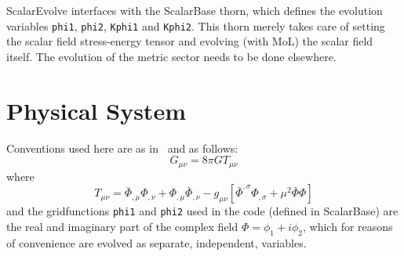 ScalarEvolve interfaces with the ScalarBase thorn, which defines the evolution
variables \texttt{phi1}, \texttt{phi2}, \texttt{Kphi1} and \texttt{Kphi2}.
%
This thorn merely takes care of setting the scalar field stress-energy tensor
and evolving (with MoL) the scalar field itself. The evolution of the metric
sector needs to be done elsewhere.

\section{Physical System}

Conventions used here are as in~\cite{Scalar_Cunha:2017wao} and as follows:
\begin{equation}
  G_{\mu \nu} = 8 \pi G T_{\mu \nu}
\end{equation}
where
\begin{equation}
  T_{\mu \nu} = \bar \Phi_{,\mu} \Phi_{,\nu} + \Phi_{,\mu} \bar \Phi_{,\nu}
                - g_{\mu \nu} [  \bar \Phi^{,\sigma} \Phi_{,\sigma}
                               + \mu^2 \bar \Phi \Phi ]
\end{equation}
and the gridfunctions \texttt{phi1} and \texttt{phi2} used in the code (defined in ScalarBase) are the real and imaginary part of the
complex field $\Phi = \phi_1 + i \phi_2$, which for reasons of convenience are evolved as separate, independent, variables.

